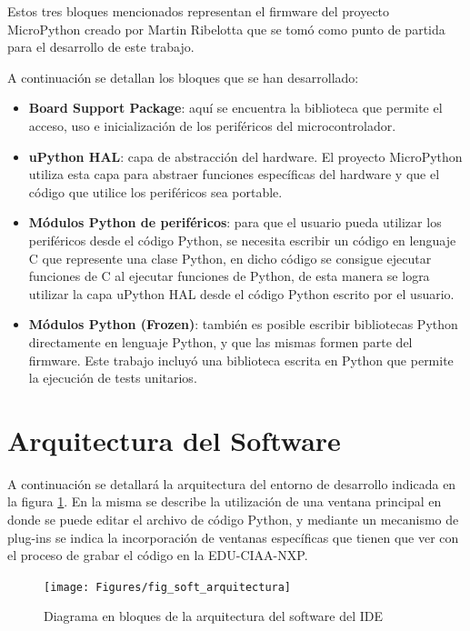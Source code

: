 Estos tres bloques mencionados representan el firmware del proyecto MicroPython creado por Martin Ribelotta que se tomó como punto de partida para el desarrollo de este trabajo. 

A continuación se detallan los bloques que se han desarrollado:

\begin{itemize}
	\item \textbf{Board Support Package}: aquí se encuentra la biblioteca que permite el acceso, uso e inicialización de los periféricos del microcontrolador.
	\item \textbf{uPython HAL}: capa de abstracción del hardware. El proyecto MicroPython utiliza esta capa para abstraer funciones específicas del hardware y que el código que utilice los periféricos sea portable.
	\item \textbf{Módulos Python de periféricos}: para que el usuario pueda utilizar los periféricos desde el código Python, se necesita escribir un código en lenguaje C que represente una clase Python, en dicho código se consigue ejecutar funciones de C al ejecutar funciones de Python, de esta manera se logra utilizar la capa uPython HAL desde el código Python escrito por el usuario.
	\item \textbf{Módulos Python (Frozen)}: también es posible escribir bibliotecas Python directamente en lenguaje Python, y que las mismas formen parte del firmware. Este trabajo incluyó una biblioteca escrita en Python que permite la ejecución de tests unitarios.
\end{itemize}


\section{Arquitectura del Software}
\label{sec:softwareArq}

A continuación se detallará la arquitectura del entorno de desarrollo indicada en la figura \ref{fig:softwareArq}. En la misma se describe la utilización de una ventana principal en donde se puede editar el archivo de código Python, y mediante un mecanismo de plug-ins se indica la incorporación de ventanas específicas que tienen que ver con el proceso de grabar el código en la EDU-CIAA-NXP. 

\begin{figure}[ht]
  \centering
    \texttt{[image: Figures/fig\_soft\_arquitectura]}
  \caption{Diagrama en bloques de la arquitectura del software del IDE}
  \label{fig:softwareArq}
\end{figure}

